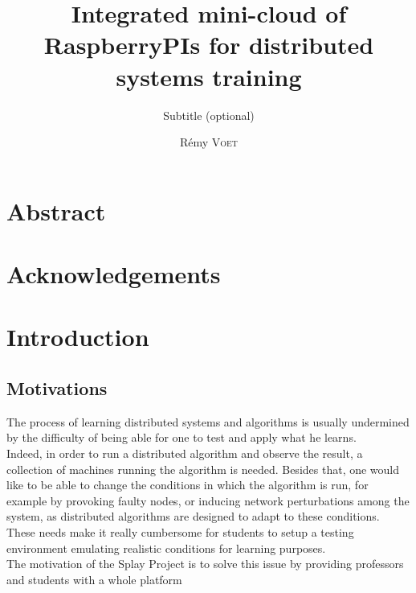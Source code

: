 \documentclass{eplmastersthesis}
\title{Integrated mini-cloud of RaspberryPIs for distributed systems training}
\subtitle{Subtitle (optional)}
\author{Rémy \textsc{Voet}}
\begin{document}
  \maketitle

  \chapter*{Abstract}

  \chapter*{Acknowledgements}

  \tableofcontents

  \chapter{Introduction}

    \section{Motivations}

      The process of learning distributed systems and algorithms is usually
      undermined by the difficulty of being able for one to test and apply
      what he learns.\\
      Indeed, in order to run a distributed algorithm and observe the result, a
      collection of machines running the algorithm is needed. Besides that,
      one would like to be able to change the conditions in which the algorithm
      is run, for example by provoking faulty nodes, or inducing network
      perturbations among the system, as distributed algorithms are designed to
      adapt to these conditions. These needs make it really cumbersome
      for students to setup a testing environment emulating realistic
      conditions for learning purposes.\\

      The motivation of the Splay Project is to solve this issue by providing
      professors and students with a whole platform




  \backcoverpage
\end{document}
